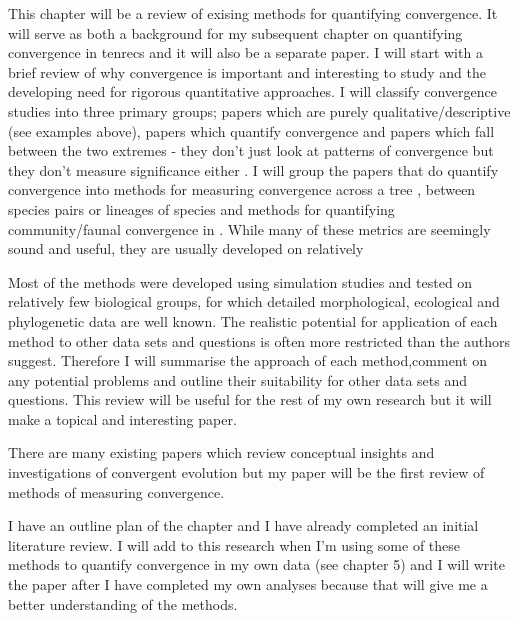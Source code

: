 \documentclass[12pt,a4paper]{article}
\begin{document}
\begin{enumerate}
This chapter will be a review of exising methods for quantifying convergence. It will serve as both a background for my subsequent chapter on quantifying convergence in tenrecs and it will also be a separate paper. 
I will start with a brief review of why convergence is important and interesting to study and the developing need for rigorous quantitative approaches. I will classify convergence studies into three primary groups; papers which are purely qualitative/descriptive (see examples above), papers which quantify convergence and papers which fall between the two extremes - they don't just look at patterns of convergence but they don't measure significance either  \citep[e.g.][]{Tseng2013, Kawahara2013, Wroe2007, Jones2007, Clark2005}. I will group the papers that do quantify convergence into methods for measuring convergence across a tree \citep{Stayton2008}, between species pairs \citep{Muschick2012, Stayton2006, Harmon2005} or lineages of species \citep{Revell2007} and methods for quantifying community/faunal convergence in \citep{Burd2014, Alvarado2013, Ingram2013, Mahler2013, Moen2013, Segar2013, Elias2008, Melville2006}.  
While many of these metrics are seemingly sound and useful, they are usually developed on relatively 


Most of the methods were developed using simulation studies and tested on relatively few biological groups, for which detailed morphological, ecological and phylogenetic data are well known. The realistic potential for application of each method to other data sets and questions is often more restricted than the authors suggest. Therefore I will summarise the approach of each method,comment on any potential problems and outline their suitability for other data sets and questions. This review will be useful for the rest of my own research but it will make a topical and interesting paper.  

There are many existing papers which review conceptual insights and investigations of convergent evolution \citep[e.g.][]{Losos2011, Conway-Morris2006, Scheffer2006} but my paper will be the first review of methods of measuring convergence. 

I have an outline plan of the chapter and I have already completed an initial literature review. I will add to this research when I'm using some of these methods to quantify convergence in my own data (see chapter 5) and I will write the paper after I have completed my own analyses because that will give me a better understanding of the methods.


\end{enumerate}
\end{document}

